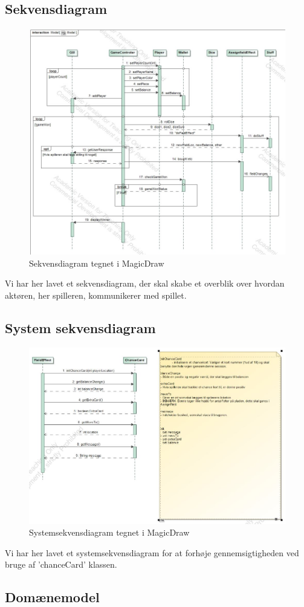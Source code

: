 \subsection{Sekvensdiagram}
        \begin{figure}[h]
            \advance\leftskip-3cm
            \includegraphics[width=18cm]{fig/Sekvensdiagram(1).jpg}
            \caption{Sekvensdiagram tegnet i MagicDraw}
        \end{figure}
    Vi har her lavet et sekvensdiagram, der skal skabe et overblik over hvordan aktøren, her spilleren,
    kommunikerer med spillet.
\subsection{System sekvensdiagram}
        \begin{figure}[h]
            \advance\leftskip-3cm
            \includegraphics[width=20cm]{fig/SSD.jpg}
            \caption{Systemsekvensdiagram tegnet i MagicDraw}
        \end{figure}
    Vi har her lavet et systemsekvensdiagram for at forhøje gennemsigtigheden ved bruge af
    'chanceCard' klassen.
\subsection{Domænemodel}
